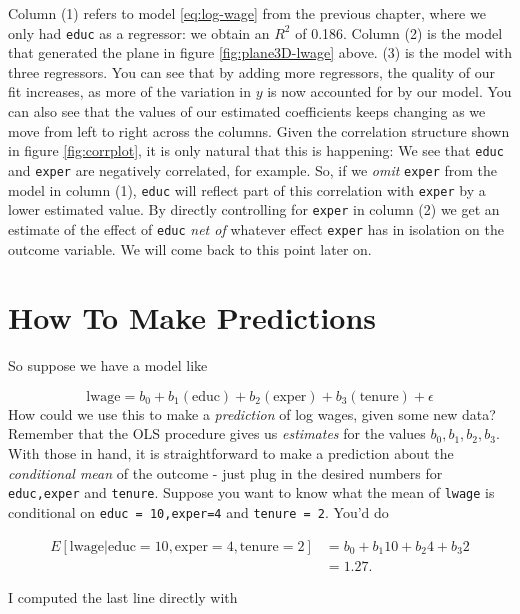 \documentclass[]{book}
\newenvironment{Shaded}{\begin{snugshade}}{\end{snugshade}}
\newcommand{\KeywordTok}[1]{\textcolor[rgb]{0.13,0.29,0.53}{\textbf{#1}}}
\newcommand{\DecValTok}[1]{\textcolor[rgb]{0.00,0.00,0.81}{#1}}
\newcommand{\StringTok}[1]{\textcolor[rgb]{0.31,0.60,0.02}{#1}}
\newcommand{\CommentTok}[1]{\textcolor[rgb]{0.56,0.35,0.01}{\textit{#1}}}
\newcommand{\OperatorTok}[1]{\textcolor[rgb]{0.81,0.36,0.00}{\textbf{#1}}}
\newcommand{\NormalTok}[1]{#1}
\begin{document}
Column (1) refers to model \eqref{eq:log-wage} from the previous chapter,
where we only had \texttt{educ} as a regressor: we obtain an \(R^2\) of
0.186. Column (2) is the model that generated the plane in figure
\ref{fig:plane3D-lwage} above. (3) is the model with three regressors.
You can see that by adding more regressors, the quality of our fit
increases, as more of the variation in \(y\) is now accounted for by our
model. You can also see that the values of our estimated coefficients
keeps changing as we move from left to right across the columns. Given
the correlation structure shown in figure \ref{fig:corrplot}, it is only
natural that this is happening: We see that \texttt{educ} and
\texttt{exper} are negatively correlated, for example. So, if we
\emph{omit} \texttt{exper} from the model in column (1), \texttt{educ}
will reflect part of this correlation with \texttt{exper} by a lower
estimated value. By directly controlling for \texttt{exper} in column
(2) we get an estimate of the effect of \texttt{educ} \emph{net of}
whatever effect \texttt{exper} has in isolation on the outcome variable.
We will come back to this point later on.

\section{How To Make Predictions}\label{make-preds}

So suppose we have a model like

\[\text{lwage} = b_0 + b_{1}(\text{educ}) + b_{2}(\text{exper}) + b_{3}(\text{tenure}) + \epsilon\]
How could we use this to make a \emph{prediction} of log wages, given
some new data? Remember that the OLS procedure gives us \emph{estimates}
for the values \(b_0,b_1, b_2,b_3\). With those in hand, it is
straightforward to make a prediction about the \emph{conditional mean}
of the outcome - just plug in the desired numbers for
\texttt{educ,exper} and \texttt{tenure}. Suppose you want to know what
the mean of \texttt{lwage} is conditional on
\texttt{educ\ =\ 10,exper=4} and \texttt{tenure\ =\ 2}. You'd do

\begin{align}
E[\text{lwage}|\text{educ}=10,\text{exper}=4,\text{tenure}=2] &= b_0 + b_1  10 + b_2 4 + b_3  2\\
&= 1.27.
\end{align}

I computed the last line directly with

\begin{Shaded}
\end{Shaded}
\end{document}
